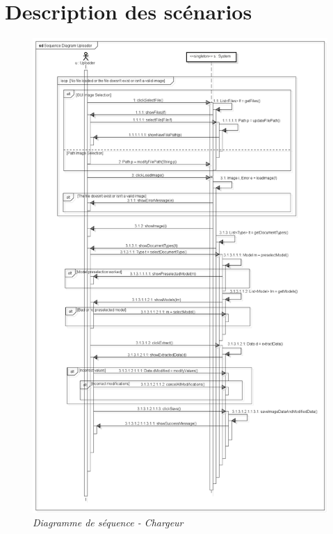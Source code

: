 \newpage

\section{Description des scénarios}
\begin{figure}[h]
	\begin{center}
		\includegraphics[scale = 0.3]{img/seqDiagUploader.png}
	\end{center}
	\caption{\it Diagramme de séquence - Chargeur}
	\label{seqDiagUploader}
\end{figure}


